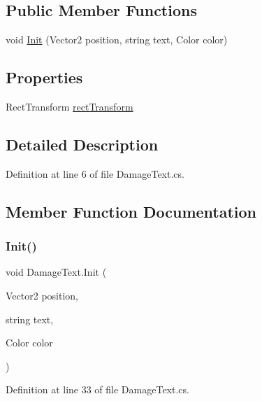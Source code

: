 \subsection*{Public Member Functions}
\begin{DoxyCompactItemize}
\item 
void \mbox{\hyperlink{class_damage_text_ab66ed998f41cdeb84c22449950170f67}{Init}} (Vector2 position, string text, Color color)
\end{DoxyCompactItemize}
\subsection*{Properties}
\begin{DoxyCompactItemize}
\item 
Rect\+Transform \mbox{\hyperlink{class_damage_text_ae6860819b6715004f9f05314039aa978}{rect\+Transform}}
\end{DoxyCompactItemize}


\subsection{Detailed Description}


Definition at line 6 of file Damage\+Text.\+cs.



\subsection{Member Function Documentation}
\mbox{\label{class_damage_text_ab66ed998f41cdeb84c22449950170f67}} 
\subsubsection{\texorpdfstring{Init()}{Init()}}
{\footnotesize\ttfamily void Damage\+Text.\+Init (\begin{DoxyParamCaption}\item[{Vector2}]{position,  }\item[{string}]{text,  }\item[{Color}]{color }\end{DoxyParamCaption})}



Definition at line 33 of file Damage\+Text.\+cs.

